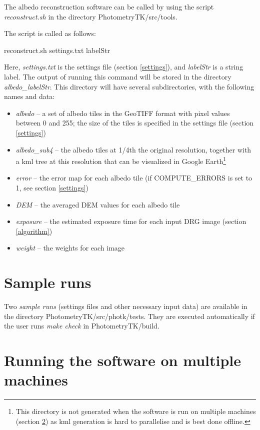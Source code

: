 \documentclass[letterpaper,fleqn,11pt]{report}
\begin{document}
The albedo reconstruction software can be called by using the script
{\it reconstruct.sh} in the directory PhotometryTK/src/tools.

The script is called as follows:

reconstruct.sh settings.txt labelStr

Here, {\it settings.txt} is the settings file (section \ref{settings}), and
{\it labelStr} is a string label. The output of running this command will be
stored in the directory {\it albedo\_labelStr}. This directory will have several subdirectories, with the following names and data:

\begin{itemize}
\item {\it albedo} --  a set of albedo tiles in the GeoTIFF format with pixel values between 0 and 255; the size of the tiles is specified in the settings file (section \ref{settings})
\item {\it albedo\_sub4} -- the albedo tiles at 1/4th the original resolution, together with a kml tree at this resolution that can be visualized in Google Earth\footnote{This directory is not generated when the software is run on multiple machines (section \ref{supercomp}) as kml generation is hard to parallelise and is best done offline.}
\item {\it error} --  the error map for each albedo tile (if
  COMPUTE\_ERRORS is set to 1, see section \ref{settings})
\item {\it DEM} --  the averaged DEM values for each albedo tile
\item {\it exposure} --  the estimated exposure time for each input DRG
  image (section \ref{algorithm})
\item {\it weight} --  the weights for each image
\end{itemize}

\section{Sample runs}\label{samples}

Two {\it sample runs} (settings files and other necessary input data)
are available in the directory PhotometryTK/src/photk/tests. They are executed automatically if the user
runs {\it make check} in PhotometryTK/build.


\section{Running the software on multiple machines}\label{supercomp}
\end{document}
